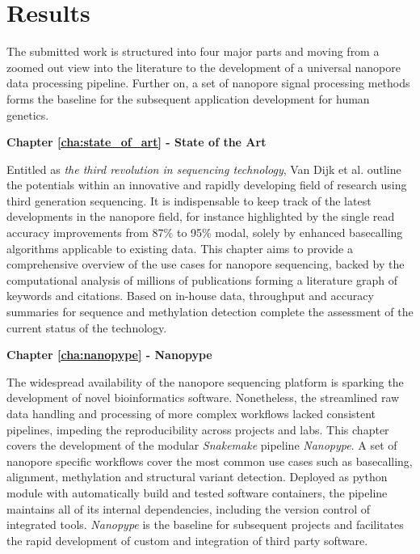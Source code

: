 \section{Results}
\label{sec:intro:structure}

The submitted work is structured into four major parts and moving from a zoomed out view into the literature to the development of a universal nanopore data processing pipeline. 
Further on, a set of nanopore signal processing methods forms the baseline for the subsequent application development for human genetics.

\textbf{Chapter \ref{cha:state_of_art} - State of the Art} %

Entitled as \textit{the third revolution in sequencing technology}, Van Dijk et al. \cite{Dijk2018} outline the potentials within an innovative and rapidly developing field of research using third generation sequencing.
It is indispensable to keep track of the latest developments in the nanopore field, for instance highlighted by the single read accuracy improvements from 87\% to 95\% modal, solely by enhanced basecalling algorithms applicable to existing data.
This chapter aims to provide a comprehensive overview of the use cases for nanopore sequencing, backed by the computational analysis of millions of publications forming a literature graph of keywords and citations.
Based on in-house data, throughput and accuracy summaries for sequence and methylation detection complete the assessment of the current status of the technology.


\textbf{Chapter \ref{cha:nanopype} - Nanopype}

The widespread availability of the nanopore sequencing platform is sparking the development of novel bioinformatics software.
Nonetheless, the streamlined raw data handling and processing of more complex workflows lacked consistent pipelines, impeding the reproducibility across projects and labs.
This chapter covers the development of the modular \textit{Snakemake} pipeline \textit{Nanopype}.
A set of nanopore specific workflows cover the most common use cases such as basecalling, alignment, methylation and structural variant detection.
Deployed as python module with automatically build and tested software containers, the pipeline maintains all of its internal dependencies, including the version control of integrated tools.
\textit{Nanopype} is the baseline for subsequent projects and facilitates the rapid development of custom and integration of third party software.


